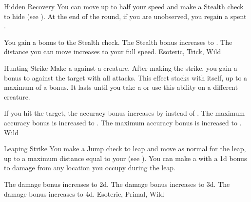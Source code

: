 \lowercase{\hypertarget{maneuver:Hidden Recovery}{}}\label{maneuver:Hidden Recovery}
\hypertarget{maneuver:Hidden Recovery}{}
\begin{freeability}{Hidden Recovery}
You can move up to half your speed and make a Stealth check to hide (see ).
At the end of the round, if you are unobserved, you regain a spent .

\rankline
{} You gain a  bonus to the Stealth check.
 The Stealth bonus increases to .
 The distance you can move increases to your full speed.
 Esoteric, Trick, Wild
\end{freeability}
\vspace{0.25em}



\lowercase{\hypertarget{maneuver:Hunting Strike}{}}\label{maneuver:Hunting Strike}
\hypertarget{maneuver:Hunting Strike}{}
\begin{freeability}{Hunting Strike}
Make a  against a creature.
After making the strike, you gain a  bonus to  against the target with all attacks.
This effect stacks with itself, up to a maximum of a  bonus.
It lasts until you take a  or use this ability on a different creature.

\rankline
{} If you hit the target, the accuracy bonus increases by  instead of .
 The maximum accuracy bonus is increased to .
 The maximum accuracy bonus is increased to .
 Wild
\end{freeability}
\vspace{0.25em}



\lowercase{\hypertarget{maneuver:Leaping Strike}{}}\label{maneuver:Leaping Strike}
\hypertarget{maneuver:Leaping Strike}{}
\begin{apability}{Leaping Strike}
You make a Jump check to leap and move as normal for the leap, up to a maximum distance equal to your  (see ).
You can make a  with a \plus1d bonus to damage from any location you occupy during the leap.

\rankline
{} The damage bonus increases to \plus2d.
 The damage bonus increases to \plus3d.
 The damage bonus increases to \plus4d.
 Esoteric, Primal, Wild
\end{apability}
\vspace{0.25em}



